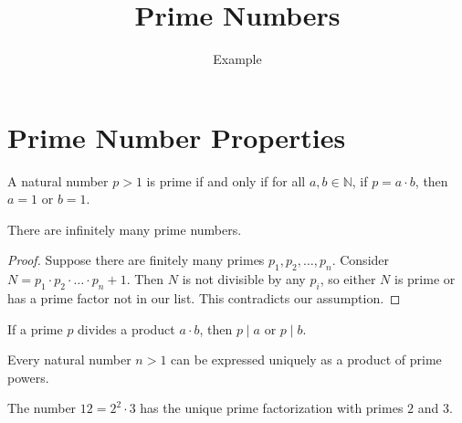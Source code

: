 \documentclass{article}
\title{Prime Numbers}
\author{Example}
\begin{document}
\maketitle

\section{Prime Number Properties}

\begin{definition}
A natural number $p > 1$ is prime if and only if for all $a, b \in \mathbb{N}$, if $p = a \cdot b$, then $a = 1$ or $b = 1$.
\end{definition}

\begin{theorem}
There are infinitely many prime numbers.
\end{theorem}

\begin{proof}
Suppose there are finitely many primes $p_1, p_2, \ldots, p_n$. 
Consider $N = p_1 \cdot p_2 \cdot \ldots \cdot p_n + 1$.
Then $N$ is not divisible by any $p_i$, so either $N$ is prime or has a prime factor not in our list.
This contradicts our assumption.
\end{proof}

\begin{lemma}
If a prime $p$ divides a product $a \cdot b$, then $p \mid a$ or $p \mid b$.
\end{lemma}

\begin{theorem}
Every natural number $n > 1$ can be expressed uniquely as a product of prime powers.
\end{theorem}

\begin{example}
The number $12 = 2^2 \cdot 3$ has the unique prime factorization with primes $2$ and $3$.
\end{example}
\end{document}
